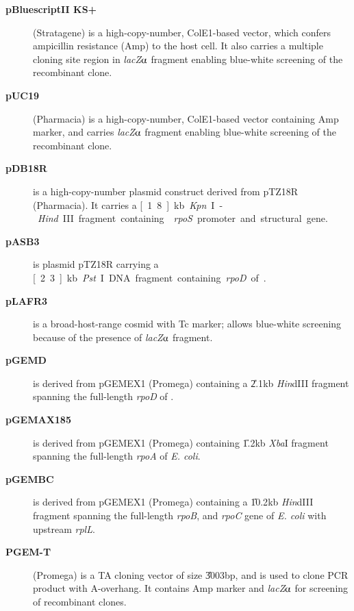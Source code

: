 \begin{description}

    \item [\textbf{pBluescriptII KS+}] (Stratagene) is a high-copy-number, ColE1-based
    vec\-tor, which confers ampicillin resistance (Amp) to the host cell.
It also carries a
        multiple cloning site region in \textit{lacZ$\alphaup$}
        fragment enabling blue-white screening of the recombinant
        clone.
    \item[\textbf{pUC19}] (Pharmacia) is a high-copy-number, ColE1-based vector containing Amp marker, and carries
    \textit{lacZ}$\alphaup$ fragment enabling blue-white screening
    of the recombinant clone.

    \item [\textbf{pDB18R}] \citep{Fujita1994} is a high-copy-number plasmid
        construct derived from pTZ18R (Pharmacia). It carries a
        \unit[1.8]{kb} \textit{Kpn}I-\textit{Hind}III fragment containing
         \textit{rpoS} promoter and
        structural gene.

    \item [\textbf{pASB3}] \citep{Tanaka1991} is plasmid pTZ18R carrying a
        \unit[2.3]{kb} \textit{Pst}I DNA fragment containing \textit{rpoD} of
        .

    \item [\textbf{pLAFR3}] \citep{Staskawicz1987} is a broad-host-range cosmid with Tc marker; allows blue-white screening because of the presence of
\emph{lacZ}$\alphaup$ fragment.

    \item [\textbf{pGEMD}] \citep{Igarashi1991} is derived from
    pGEMEX1 (Promega) containing a \U{2.1}{kb} \emph{Hin}dIII
    fragment spanning the full-length \emph{rpoD} of .

    \item[\textbf{pGEMAX185}] \citep{Igarashi1991} is derived from
    pGEMEX1 (Pro\-mega) containing \U{1.2}{kb} \emph{Xba}I
    fragment spanning the full-length \emph{rpoA}
    of \emph{E. coli}.

    \item[\textbf{pGEMBC}] \citep{Igarashi1991} is derived from
    pGEMEX1 (Promega) containing a \U{10.2}{kb} \emph{Hin}dIII
    fragment spanning the full-length \emph{rpoB}, and \emph{rpoC}
    gene of \emph{E. coli} with upstream \emph{rplL}.

    \item[\textbf{PGEM-T}] (Promega) is a TA cloning vector of size \U{3003}{bp}, and is used to clone
    PCR product with A-overhang. It contains Amp marker and
    \textit{lacZ}$\alphaup$ for screening of recombinant clones.


\end{description}
